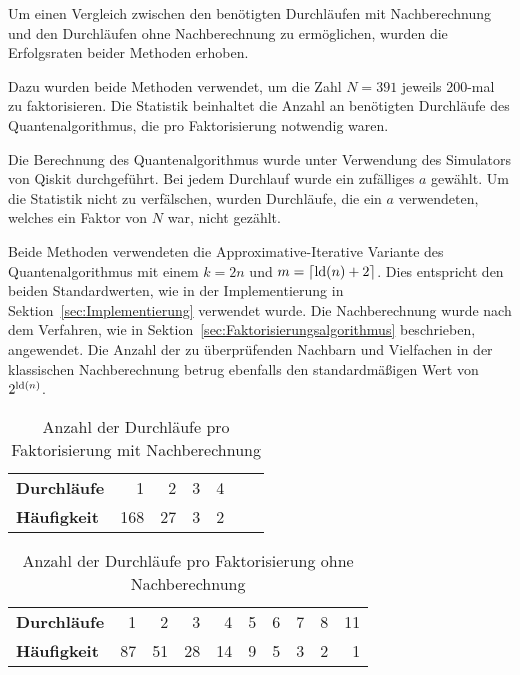 Um einen Vergleich zwischen den benötigten Durchläufen mit Nachberechnung und den Durchläufen ohne Nachberechnung zu ermöglichen, 
wurden die Erfolgsraten beider Methoden erhoben.

Dazu wurden beide Methoden verwendet, um die Zahl \(N=391\) jeweils 200-mal zu faktorisieren.
Die Statistik beinhaltet die Anzahl an benötigten Durchläufe des Quantenalgorithmus, die pro Faktorisierung notwendig waren.

Die Berechnung des Quantenalgorithmus wurde unter Verwendung des Simulators von Qiskit durchgeführt. 
Bei jedem Durchlauf wurde ein zufälliges \(a\) gewählt.
Um die Statistik nicht zu verfälschen, wurden Durchläufe, die ein \(a\) verwendeten, 
welches ein Faktor von \(N\) war, nicht gezählt.

Beide Methoden verwendeten die Approximative-Iterative Variante des Quantenalgorithmus mit einem \(k=2n\) und \(m=\lceil\operatorname{ld}(n)+2\rceil\).
Dies entspricht den beiden Standardwerten, 
wie in der Implementierung in Sektion~\ref{sec:Implementierung} verwendet wurde. 
Die Nachberechnung wurde nach dem Verfahren, wie in Sektion~\ref{sec:Faktorisierungsalgorithmus} beschrieben, angewendet. 
Die Anzahl der zu überprüfenden Nachbarn und Vielfachen in der klassischen Nachberechnung betrug ebenfalls den standardmäßigen Wert von \(2^{\operatorname{ld}(n)}\).

\begin{table}[h]
    \centering
    \begin{tabular}{lrrrrrr} 
        \hline
        \textbf{Durchläufe} & 1 & 2 & 3 & 4\\
        \textbf{Häufigkeit} & 168 & 27 & 3 & 2 \\
        \hline
    \end{tabular}
    \caption{Anzahl der Durchläufe pro Faktorisierung mit Nachberechnung}
    \label{Nachberechnung}
\end{table}

\begin{table}[h]
    \centering
    \begin{tabular}{lrrrrrrrrr} 
        \hline
        \textbf{Durchläufe} & 1 & 2 & 3 & 4 & 5 & 6 & 7 & 8 & 11 \\
        \textbf{Häufigkeit} & 87 & 51 & 28 & 14 & 9 & 5 & 3 & 2 & 1 \\
        \hline
    \end{tabular}
    \caption{Anzahl der Durchläufe pro Faktorisierung ohne Nachberechnung}
    \label{ohneNachberechnung}
\end{table}

